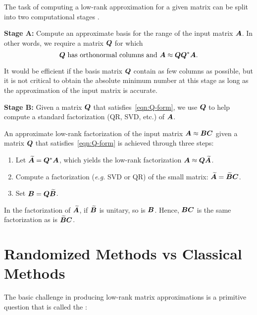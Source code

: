 \documentclass[12pt]{article}
\begin{document}
The task of computing a low-rank approximation for a given matrix can be split into two computational stages \cite{RM}. 

\textbf{Stage A:} Compute an approximate basis for the range of the input matrix $\bm{A}$. In other words,
we require a matrix $\bm{Q}$ for which
\begin{equation} \label{eqn:Q-form}
\text{$\bm{Q}$ has orthonormal columns and $\bm{A} \approx \bm{Q}\bm{Q}^{*}\bm{A}$.}
\end{equation}

It would be efficient if the basis matrix $\bm{Q}$ contain as few columns as possible, but it is not critical to obtain the absolute minimum number at this stage as long as
the approximation of the input matrix is accurate.

\textbf{Stage B:}
Given a matrix $\bm{Q}$ that satisfies~\eqref{eqn:Q-form},
we use $\bm{Q}$ to help compute a standard factorization (QR, SVD, etc.) of $\bm{A}$.

An approximate low-rank factorization of the input matrix $\bm{A} \approx \bm{BC}$ given a matrix $\bm{Q}$ that satisfies~\eqref{eqn:Q-form} is achieved through three steps:
\begin{enumerate}
\item   Let $\widetilde{\bm{A}} = \bm{Q}^{*}\bm{A}$, which yields
the low-rank factorization $\bm{A} \approx \bm{Q}\widetilde{\bm{A}}$.
\item   Compute a factorization (\textit{e.g.} SVD or QR) of the small matrix: $\widetilde{\bm{A}} = \widetilde{\bm{B}}\bm{C}$.
\item   Set $\bm{B} = \bm{Q}\widetilde{\bm{B}}$.
\end{enumerate}
In the factorization of $\widetilde{\bm{A}}$, if $\widetilde{\bm{B}}$ is unitary, so is $\bm{B}$. Hence, $\bm{BC}$ is the same factorization as is $\widetilde{\bm{B}}\bm{C}$.

\section{Randomized Methods vs Classical Methods}
\label{comparision}

The basic challenge in producing low-rank matrix approximations is a primitive question that is called the  \cite{RM}:
\end{document}
